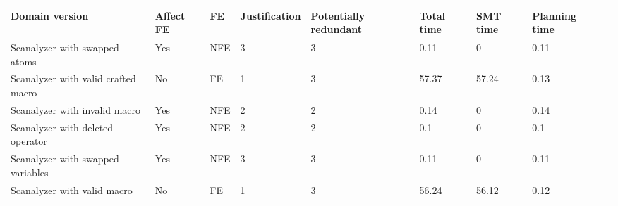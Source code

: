 \begin{table}[] 
\begin{tabular}{|l|l|l|l|l|l|l|l|l|} 
\hline 
\textbf{Domain version}  & \textbf{Affect FE} & \textbf{FE} & \textbf{Justification} &  \textbf{Potentially redundant} & \textbf{Total time}  & \textbf{SMT time}  & \textbf{Planning time}    \\ \hline 
Scanalyzer with swapped atoms & Yes & NFE & 3 & 3 & 0.11 & 0 & 0.11 \\  \hline
Scanalyzer with valid crafted macro & No & FE & 1 & 3 & 57.37 & 57.24 & 0.13 \\  \hline
Scanalyzer with invalid macro & Yes & NFE & 2 & 2 & 0.14 & 0 & 0.14 \\  \hline
Scanalyzer with deleted operator & Yes & NFE & 2 & 2 & 0.1 & 0 & 0.1 \\  \hline
Scanalyzer with swapped variables & Yes & NFE & 3 & 3 & 0.11 & 0 & 0.11 \\  \hline
Scanalyzer with valid macro & No & FE & 1 & 3 & 56.24 & 56.12 & 0.12 \\  \hline
\end{tabular} 
\end{table} 
